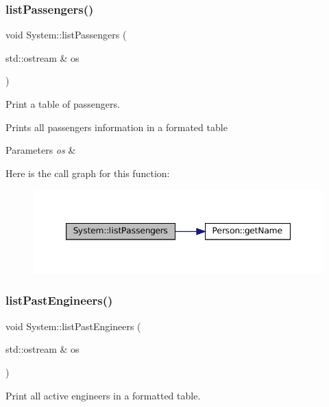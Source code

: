 \subsubsection{\texorpdfstring{list\+Passengers()}{listPassengers()}}
{\footnotesize\ttfamily void System\+::list\+Passengers (\begin{DoxyParamCaption}\item[{std\+::ostream \&}]{os }\end{DoxyParamCaption})}



Print a table of passengers. 

Prints all passengers\textquotesingle{} information in a formated table


\begin{DoxyParams}{Parameters}
{\em os} & \\
\hline
\end{DoxyParams}
Here is the call graph for this function\+:
\nopagebreak
\begin{figure}[H]
\begin{center}
\leavevmode
\includegraphics[width=347pt]{classSystem_a23c0b01d0e84fa4665ce85203ce6747b_cgraph}
\end{center}
\end{figure}
\mbox{\label{classSystem_afd19a30636955896bc6dd59d9a4ca20e}} 
\subsubsection{\texorpdfstring{list\+Past\+Engineers()}{listPastEngineers()}}
{\footnotesize\ttfamily void System\+::list\+Past\+Engineers (\begin{DoxyParamCaption}\item[{std\+::ostream \&}]{os }\end{DoxyParamCaption})}

Print all active engineers in a formatted table.


